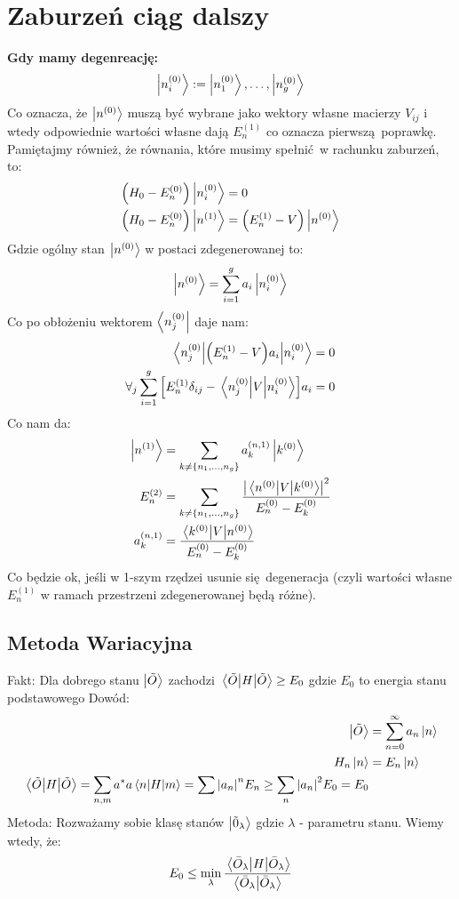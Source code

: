 \documentclass[12pt,a4paper]{report}
\renewcommand{\emph}{\textbf}
\newenvironment{lecture}[1]{\par\medskip
   \noindent\chapter{#1} \rmfamily}{\medskip}
\begin{document}
\begin{lecture}{Zaburzeń ciąg dalszy}
    \emph{Gdy mamy degenreację:}\\
    \[
        \ket{n_i^{(0)}} := \ket{n_1^{(0)}},\dots,\ket{n_g^{(0)}}  
    \]
    Co oznacza, że $\ket{n^{(0)}}$ muszą być wybrane jako wektory własne macierzy $V_{ij}$ i wtedy odpowiednie wartości własne dają $E_n^{(1)}$ co oznacza pierwszą poprawkę.
    Pamiętajmy również, że równania, które musimy spełnić w rachunku zaburzeń, to:
    \begin{align*}
        \qty(H_0 - E_n^{(0)}) \ket{n_i^{(0)}} &= 0\\
        \qty(H_0 - E_n^{(0)}) \ket{n^{(1)}} &= \qty(E_n^{(1)} - V) \ket{n^{(0)}}
    \end{align*}
    Gdzie ogólny stan $\ket{n^{(0)}}$ w postaci zdegenerowanej to:
    \[
        \ket{n^{(0)}} = \sum_{i=1}^{g} a_i \ket{n_i^{(0)}}  
    \]
    Co po obłożeniu wektorem $\bra{n_j^{(0)}}$ daje nam:
    \begin{align*}
        \mel{n_j^{(0)}}{\qty(E_n^{(1)} - V)a_i}{n_i^{(0)}} &= 0\\
        \forall_j \sum_{i=1}^{g} \qty[E_n^{(1)} \delta_{ij} - \mel{n_j^{(0)}}{V}{n_i^{(0)}}]a_i &= 0\\
    \end{align*}
    Co nam da:
    \begin{align*}
        \ket{n^{(1)}} &= \sum_{k \neq \qty{n_1, \dots, n_g}} a_k^{(n, 1)} \ket{k^{(0)}}\\
        E_n^{(2)} &= \sum_{k \neq \qty{n_1, \dots, n_g}} \frac{\abs{\mel{n^{(0)}}{V}{k^{(0)}}}^2}{E_n^{(0)} - E_k^{(0)}}\\
        a_k^{(n, 1)} &= \frac{\mel{k^{(0)}}{V}{n^{(0)}}}{E_n^{(0)} - E_k^{(0)}}
    \end{align*}
    Co będzie ok, jeśli w 1-szym rzędzei usunie się degeneracja (czyli wartości własne $E_n^{(1)}$ w ramach przestrzeni zdegenerowanej będą różne). 
    \section{Metoda Wariacyjna}
    {\color{CornflowerBlue} Fakt:} Dla dobrego stanu $\ket{\tilde{O}}$ zachodzi $\ev{H}{\tilde{O}} \geq E_0$ gdzie $E_0$ to energia stanu podstawowego
    {\color{green} Dowód:}\\
    \begin{align*}
        \ket{\tilde{O}} &= \sum_{n=0}^{\infty} a_n \ket{n}\\
        H_n \ket{n} &= E_n \ket{n}\\
        \ev{H}{\tilde{O}} = \sum_{n,m} a^\ast a \mel{n}{H}{m} = \sum \abs{a_n}^n E_n \geq \sum_n \abs{a_n}^2 E_0 = E_0
    \end{align*}
    Metoda: Rozważamy sobie klasę stanów $\ket{\tilde{0}_\lambda}$ gdzie $\lambda$ - parametru stanu. Wiemy wtedy, że:
    \[
        E_0 \leq \min_\lambda \frac{\ev{H}{\bar{O}_\lambda}}{\braket{\bar{O}_\lambda}}  
    \]

\end{lecture}
\end{document}
